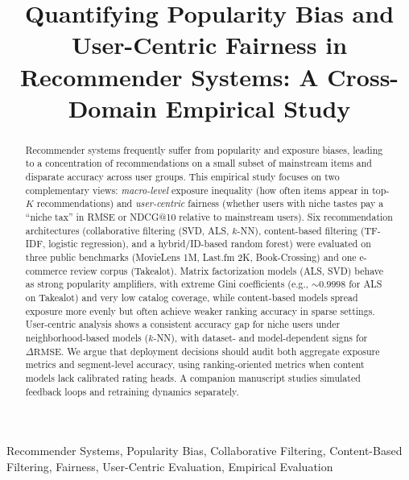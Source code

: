 \documentclass[conference]{IEEEtran}
\begin{document}
\title{Quantifying Popularity Bias and User-Centric Fairness in Recommender Systems: A Cross-Domain Empirical Study}

\author{
}

\maketitle

\begin{abstract}
Recommender systems frequently suffer from popularity and exposure biases, leading to a concentration of recommendations on a small subset of mainstream items and disparate accuracy across user groups. This empirical study focuses on two complementary views: \emph{macro-level} exposure inequality (how often items appear in top-$K$ recommendations) and \emph{user-centric} fairness (whether users with niche tastes pay a ``niche tax'' in RMSE or NDCG@10 relative to mainstream users). Six recommendation architectures (collaborative filtering (SVD, ALS, $k$-NN), content-based filtering (TF-IDF, logistic regression), and a hybrid/ID-based random forest) were evaluated on three public benchmarks (MovieLens 1M, Last.fm 2K, Book-Crossing) and one e-commerce review corpus (Takealot). Matrix factorization models (ALS, SVD) behave as strong popularity amplifiers, with extreme Gini coefficients (e.g., $\sim 0.9998$ for ALS on Takealot) and very low catalog coverage, while content-based models spread exposure more evenly but often achieve weaker ranking accuracy in sparse settings. User-centric analysis shows a consistent accuracy gap for niche users under neighborhood-based models ($k$-NN), with dataset- and model-dependent signs for $\Delta\mathrm{RMSE}$. We argue that deployment decisions should audit both aggregate exposure metrics and segment-level accuracy, using ranking-oriented metrics when content models lack calibrated rating heads. A companion manuscript studies simulated feedback loops and retraining dynamics separately.
\end{abstract}

\begin{IEEEkeywords}
Recommender Systems, Popularity Bias, Collaborative Filtering, Content-Based Filtering, Fairness, User-Centric Evaluation, Empirical Evaluation
\end{IEEEkeywords}
\end{document}
